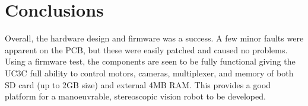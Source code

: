 \section{Conclusions}

Overall, the hardware design and firmware was a success. A few minor faults were apparent on the PCB, but these were easily patched and caused no problems. Using a firmware test, the components are seen to be fully functional giving the UC3C full ability to control motors, cameras, \itc multiplexer, and memory of both SD card (up to 2GB size) and external 4MB RAM. This provides a good platform for a manoeuvrable, stereoscopic vision robot to be developed. 